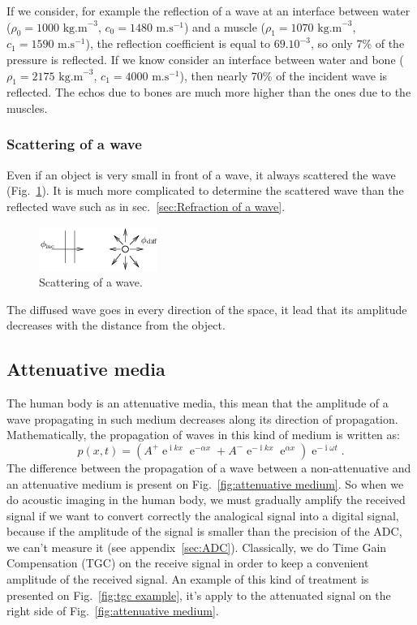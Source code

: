 \documentclass[a4paper,twoside,11pt]{article}
\DeclareMathOperator{\im}{i} %
\DeclareMathOperator{\e}{e} %
\begin{document}
If we consider, for example the reflection of a wave at an interface between 
water 
($\rho_0=1000\text{ kg.m}^{-3}$, $c_0=1480\text{ m.s}^{-1}$) and a muscle 
($\rho_1=1070\text{ kg.m}^{-3}$, $c_1=1590\text{ m.s}^{-1}$), the 
reflection coefficient is equal to $69.10^{-3}$, so only 7\% of the pressure is reflected. 
If we know consider an interface between water and bone ($\rho_1=2175\text{ 
kg.m}^{-3}$, $c_1=4000\text{ m.s}^{-1}$), then nearly 70\% of the incident wave 
is reflected. The echos due to bones are much more higher than the ones due to 
the muscles. 

\subsubsection{Scattering of a wave}
\label{sec:Diffusion of a wave}

Even if an object is very small in front of a wave, it always scattered the 
wave 
(Fig.~\ref{fig:diffusion}). It is much more complicated to determine the 
scattered wave than the reflected wave such as in sec.~\ref{sec:Refraction of a wave}.

\begin{figure}[htb]
	\centering
		\includegraphics{image/diffusion}
	\caption{Scattering of a wave.}
	\label{fig:diffusion}
\end{figure}

The diffused wave goes in every direction of the space, it lead that its 
amplitude 
decreases with the distance from the object.

\subsection{Attenuative media}
\label{sec:Attenuative media}

The human body is an attenuative media, this mean that the amplitude of a wave 
propagating in such medium decreases along its direction of propagation. 
Mathematically, the propagation of waves in this kind of medium is written as:
\begin{equation}
 p\left(x,t\right)=\left(A^{+}\e^{\im kx}\e^{-\alpha x}+A^{-}\e^{-\im 
kx}\e^{\alpha x}\right)\e^{-\im 
\omega t}.
 \label{eq:math 1D absobing formulation}
\end{equation}
The difference between the propagation of a wave between a non-attenuative and 
an attenuative medium is present on Fig.~\ref{fig:attenuative medium}. So when 
we do acoustic imaging in the human body, we must gradually amplify the 
received signal if we want to convert correctly the analogical signal into a 
digital signal, because if the amplitude of the signal is smaller than the precision 
of the ADC, we can't measure it (see appendix~\ref{sec:ADC}). Classically, we 
do Time Gain Compensation (TGC) on the receive signal in order to keep a 
convenient amplitude of the received signal. An example of this kind of 
treatment is presented on Fig.~\ref{fig:tgc example}, it's apply to the 
attenuated signal on the right side of Fig.~\ref{fig:attenuative medium}.
\end{document}
